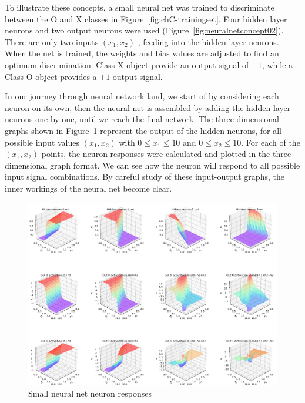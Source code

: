 To illustrate these concepts, a small neural net was trained to discriminate between the O and X classes in Figure~\ref{fig:chC-trainingset}.  Four hidden layer neurons and two output neurons were used (Figure~\ref{fig:neuralnetconcept02}).  There are only two inputs $(x_1,x_2)$ , feeding into the hidden layer neurons.  When the net is trained, the weights and bias values are adjusted to find an optimum discrimination.  Class X object provide an output signal of $-1$, while a Class O object provides a $+1$ output signal.  

In our journey through neural network land,  we start of by considering each neuron on its own, then the neural net is assembled by adding the hidden layer neurons one by one, until we reach the final network.  The three-dimensional graphs shown in Figure~\ref{fig:chC-hiddeneurons04} represent the output of the hidden neurons, for all possible input values  $(x_1,x_2)$  with $0\leq x_1 \leq 10$  and  $0\leq x_2 \leq 10$.    For each of the $(x_1,x_2)$ points, the neuron responses were calculated and plotted in the three-dimensional graph format.   We can see how the neuron will respond to all possible input signal combinations.   By careful study of these input-output graphs, the inner workings of the neural net become clear.
 
\begin{figure}[tbhp]
\centering
\includegraphics[height=1.1\textwidth,angle=90]{pic/chC-hiddeneurons04}
\caption{Small neural net neuron responses\label{fig:chC-hiddeneurons04}}
\end{figure}


